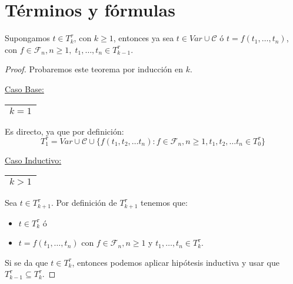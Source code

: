 \section{Términos y fórmulas}

  \begin{lemma} \label{lemma_29}
    \PN Supongamos $t \in T_{k}^{\tau}$, con $k \geq 1$, entonces ya sea $t \in Var \cup \mathcal{C}$ ó $t = f(t_{1},
    \dotsc, t_{n})$, con $f \in \mathcal{F}_{n}, n \geq 1, \; t_{1}, \dotsc, t_{n} \in T_{k-1}^{\tau}$.
  \end{lemma}
  \begin{proof}
    \PN Probaremos este teorema por inducción en $k$.

    \vspace{3mm}
    \PN \underline{Caso Base:} \begin{tabular}{|c|} \hline $k = 1$ \\\hline \end{tabular} Es directo, ya que por
    definición:
    \[
      T_{1}^{\tau} = Var \cup \mathcal{C} \cup \{f(t_{1}, t_{2}, \dotsc t_{n}): f \in \mathcal{F}_n, n \geq 1, t_{1},
      t_{2}, \dotsc t_{n} \in T_{0}^{\tau}\}
    \]

		\PN \underline{Caso Inductivo:} \begin{tabular}{|c|} \hline $k > 1$ \\\hline \end{tabular} Sea $t \in
    T_{k+1}^{\tau}$. Por definición de $ T_{k+1}^{\tau}$ tenemos que:
    \begin{itemize}
      \item $t \in T_{k}^{\tau}$ ó
      \item $t = f(t_{1}, \dotsc, t_{n})$ con $f \in \mathcal{F}_{n}, n \geq 1$ y $t_{1}, \dotsc, t_{n}\in T_{k}^{\tau}$.
    \end{itemize}

    \PN Si se da que $t \in T_{k}^{\tau}$, entonces podemos aplicar hipótesis inductiva y usar que $T_{k-1}^{\tau}
    \subseteq T_{k}^{\tau}$.
  \end{proof}

